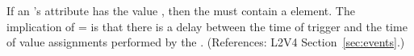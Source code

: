 If an \Event's  attribute has the value
, then the \Event must contain a \Delay element.  The
implication of = is that there
is a delay between the time of trigger and the time of value assignments
performed by the \Event.  (References: L2V4 Section~\ref{sec:events}.)
